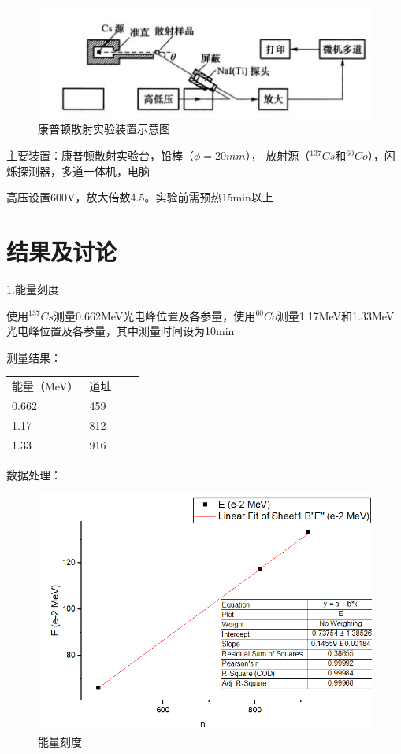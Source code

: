 \documentclass[font=default]{mpltx}
\begin{document}
\begin{figure}
  \centering
  \includegraphics[width=0.85\linewidth]{fig/instrument2.jpg}
  \caption{康普顿散射实验装置示意图}
  \label{sec:instrument2}
\end{figure}

主要装置：康普顿散射实验台，铅棒（$\phi = 20 mm$），
放射源（$ ^{137}{Cs}$和$ ^{60}{Co}$），闪烁探测器，多道一体机，电脑

高压设置600V，放大倍数4.5。实验前需预热15min以上

\section{结果及讨论}
1.能量刻度

使用$ ^{137}{Cs}$测量0.662MeV光电峰位置及各参量，使用$ ^{60}{Co}$测量1.17MeV和1.33MeV光电峰位置及各参量，其中测量时间设为10min

测量结果：

\begin{table}[]
\begin{tabular}{llll}
能量（MeV）                & 道址                  \\
0.662                     & 459                    \\
1.17                      & 812                    \\
1.33                      & 916                     \\
\end{tabular}
\end{table}

数据处理： 

\begin{figure}
  \centering
  \includegraphics[width=0.85\linewidth]{fig/data2(1).png}
  \caption{能量刻度}
  \label{sec:data2(1)}
\end{figure}
\end{document}
